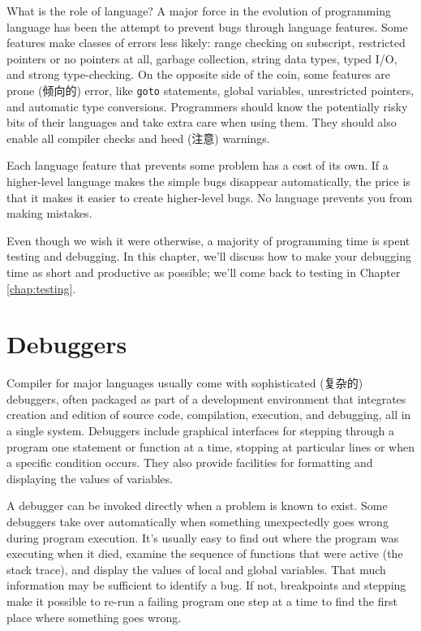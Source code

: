 What is the role of language? A major force in the evolution of programming
language has been the attempt to prevent bugs through language features.
Some features make classes of errors less likely: range checking on
subscript, restricted pointers or no pointers at all, garbage collection,
string data types, typed I/O, and strong type-checking. On the opposite side
of the coin, some features are prone (倾向的) error, like \verb'goto'
statements, global variables, unrestricted pointers, and automatic type
conversions. Programmers should know the potentially risky bits of their
languages and take extra care when using them. They should also enable all
compiler checks and heed (注意) warnings.

Each language feature that prevents some problem has a cost of its own. If
a higher-level language makes the simple bugs disappear automatically, the
price is that it makes it easier to create higher-level bugs. No language
prevents you from making mistakes.

Even though we wish it were otherwise, a majority of programming time is
spent testing and debugging. In this chapter, we'll discuss how to make
your debugging time as short and productive as possible; we'll come back to
testing in Chapter \ref{chap:testing}.

\section{Debuggers}
\label{sec:debuggers}
Compiler for major languages usually come with sophisticated (复杂的)
debuggers, often packaged as part of a development environment that
integrates creation and edition of source code, compilation, execution, and
debugging, all in a single system. Debuggers include graphical interfaces
for stepping through a program one statement or function at a time,
stopping at particular lines or when a specific condition occurs. They also
provide facilities for formatting and displaying the values of variables.

A debugger can be invoked directly when a problem is known to exist. Some
debuggers take over automatically when something unexpectedly goes wrong
during program execution. It's usually easy to find out where the program
was executing when it died, examine the sequence of functions that were
active (the stack trace), and display the values of local and global
variables. That much information may be sufficient to identify a bug. If
not, breakpoints and stepping make it possible to re-run a failing program
one step at a time to find the first place where something goes wrong.

